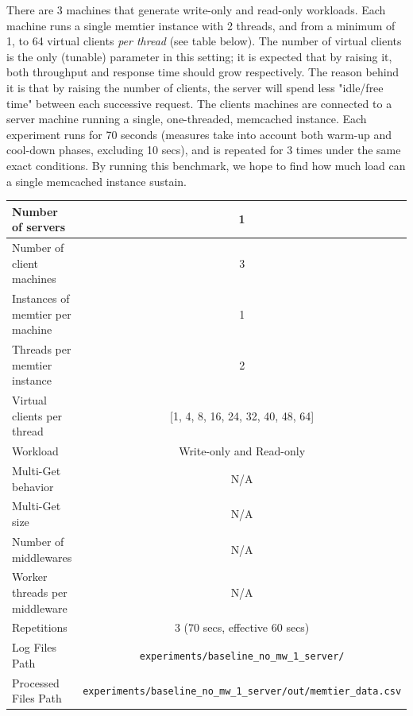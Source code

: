 \documentclass[11pt,a4paper]{article}
\begin{document}
There are 3 machines that generate write-only and read-only workloads. Each machine runs a single memtier instance with 2 threads, and from a minimum of 1, to 64 virtual clients \textit{per thread} (see table below).
The number of virtual clients is the only (tunable) parameter in this setting; it is expected that by raising it, both throughput and response time should grow respectively. The reason behind it is that by raising the number of clients, the server  will spend less "idle/free time" between each successive request.
The clients machines are connected to a server machine running a single, one-threaded, memcached instance. Each experiment runs for 70 seconds (measures take into account both warm-up and cool-down phases, excluding 10 secs), and is repeated for 3 times under the same exact conditions.
By running this benchmark, we hope to find how much load can a single memcached instance sustain.

\begin{center}
	\scriptsize{
		\begin{tabular}{|l|c|}
			\hline Number of servers                & 1                        \\ 
			\hline Number of client machines        & 3                        \\ 
			\hline Instances of memtier per machine & 1                        \\ 
			\hline Threads per memtier instance     & 2                        \\
			\hline Virtual clients per thread       & [1, 4, 8, 16, 24, 32, 40, 48, 64]\\ 
			\hline Workload                         & Write-only and Read-only \\
			\hline Multi-Get behavior               & N/A                      \\
			\hline Multi-Get size                   & N/A                      \\
			\hline Number of middlewares            & N/A                      \\
			\hline Worker threads per middleware    & N/A                      \\
            \hline Repetitions                      & 3 (70 secs, effective 60 secs) \\ 
            \hline Log Files Path                   & \texttt{experiments/baseline\_no\_mw\_1\_server/} \\
            \hline Processed Files Path             & \texttt{experiments/baseline\_no\_mw\_1\_server/out/memtier\_data.csv}\\
            \hline
		\end{tabular}
	} 
\end{center}
\end{document}
